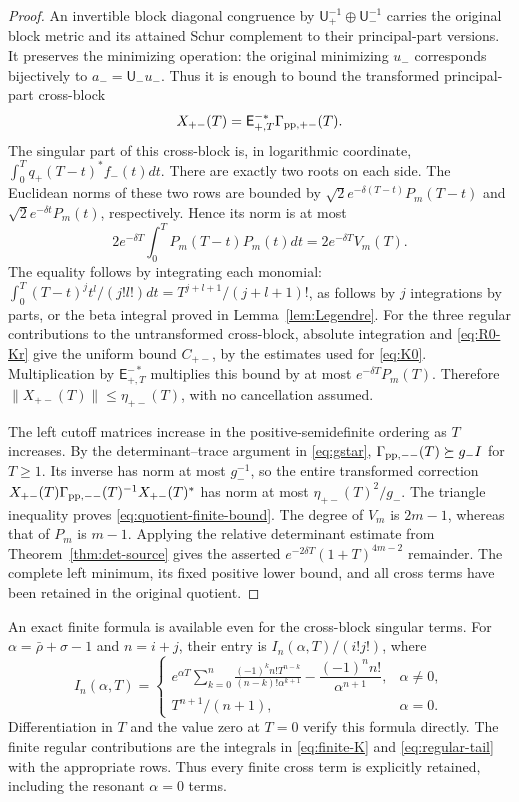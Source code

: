 \documentclass[11pt]{article}
\newcommand{\U}{\mathsf U}\newcommand{\E}{\mathsf E}
\begin{document}
\begin{proof}
An invertible block diagonal congruence by
$\U_+^{-1}\oplus\U_-^{-1}$ carries the original block metric and
its attained Schur complement to their principal-part versions.
It preserves the minimizing operation: the original minimizing
$u_-$ corresponds bijectively to $a_-=\U_-u_-$. Thus it is enough
to bound the transformed principal-part cross-block
\[
 X_{+-}(T)=\E_{+,T}^{-*}\Gamma_{{\rm pp},+-}(T).
\]
The singular part of this cross-block is, in logarithmic coordinate,
$\int_0^Tq_+(T-t)^*f_-(t)dt$. There are exactly two roots on
each side. The Euclidean norms of these two rows are bounded by
$\sqrt2e^{-\delta(T-t)}P_m(T-t)$ and
$\sqrt2e^{-\delta t}P_m(t)$, respectively. Hence its norm is at most
\[
 2e^{-\delta T}\int_0^TP_m(T-t)P_m(t)dt
                       =2e^{-\delta T}V_m(T).
\]
The equality follows by integrating each monomial:
$\int_0^T(T-t)^jt^l/(j!l!)dt=T^{j+l+1}/(j+l+1)!$,
as follows by $j$ integrations by parts, or the beta integral
proved in Lemma~\ref{lem:Legendre}.
For the three regular contributions to the untransformed
cross-block, absolute integration and \eqref{eq:R0-Kr} give the
uniform bound $C_{+-}$, by the estimates used for
\eqref{eq:K0}. Multiplication by $\E_{+,T}^{-*}$ multiplies this
bound by at most $e^{-\delta T}P_m(T)$. Therefore
$\|X_{+-}(T)\|\le\eta_{+-}(T)$, with no cancellation assumed.

The left cutoff matrices increase in the positive-semidefinite
ordering as $T$ increases. By the determinant--trace argument in
\eqref{eq:gstar}, $\Gamma_{\rm pp,--}(T)\succeq g_-I$ for
$T\ge1$. Its inverse has norm at most $g_-^{-1}$, so the entire
transformed correction $X_{+-}(T)\Gamma_{\rm pp,--}(T)^{-1}
X_{+-}(T)^*$ has norm at most $\eta_{+-}(T)^2/g_-$.
The triangle inequality proves \eqref{eq:quotient-finite-bound}.
The degree of $V_m$ is $2m-1$, whereas that of $P_m$ is $m-1$.
Applying the relative determinant estimate from
Theorem~\ref{thm:det-source} gives the asserted
$e^{-2\delta T}(1+T)^{4m-2}$ remainder. The complete left
minimum, its fixed positive lower bound, and all cross terms have
been retained in the original quotient.
\end{proof}

An exact finite formula is available even for the cross-block singular
terms. For $\alpha=\bar\rho+\sigma-1$ and $n=i+j$, their entry is
$I_n(\alpha,T)/(i!j!)$, where
\[
 I_n(\alpha,T)=
 \begin{cases}
 e^{\alpha T}\displaystyle\sum_{k=0}^n
 \frac{(-1)^k n!T^{n-k}}{(n-k)!\alpha^{k+1}}
                  -\dfrac{(-1)^n n!}{\alpha^{n+1}},&\alpha\ne0,\\[4pt]
 T^{n+1}/(n+1),&\alpha=0.
 \end{cases}\tag{EG41}\label{eq:finite-moment}
\]
Differentiation in $T$ and the value zero at $T=0$ verify this
formula directly. The finite regular contributions are the integrals
in \eqref{eq:finite-K} and \eqref{eq:regular-tail} with the appropriate
rows. Thus every finite cross term is explicitly retained, including
the resonant $\alpha=0$ terms.
\end{document}
